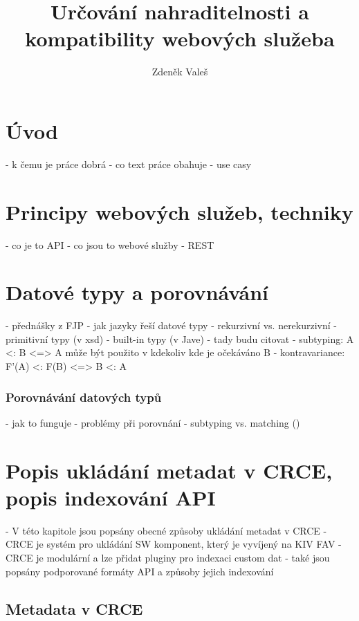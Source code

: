 \documentclass[czech,DP]{thesiskiv}
\author{Zdeněk Valeš}
\title{Určování nahraditelnosti a\\kompatibility webových služeba}
\begin{document}
%
\maketitle
\tableofcontents

\chapter{Úvod}

- k čemu je práce dobrá
- co text práce obahuje
- use casy

\chapter{Principy webových služeb, techniky}

 - co je to API
 - co jsou to webové služby
 - REST

\chapter{Datové typy a porovnávání}

- přednášky z FJP
- jak jazyky řeší datové typy
	- rekurzivní vs. nerekurzivní
- primitivní typy (v xsd)
- built-in typy (v Jave)
- tady budu citovat \cite{abadi1995subytping}
	- subtyping: A <: B <=> A může být použito v kdekoliv kde je očekáváno B
	- kontravariance: F'(A) <: F(B) <=> B <: A

\subsection{Porovnávání datových typů}

 - jak to funguje
 - problémy při porovnání
 - subtyping vs. matching (\cite{abadi1995subytping})


\chapter{Popis ukládání metadat v CRCE, popis indexování API}

 - V této kapitole jsou popsány obecné způsoby ukládání metadat v CRCE \cite{brada2015repository}
 - CRCE je systém pro ukládání SW komponent, který je vyvíjený na KIV FAV
 - CRCE je modulární a lze přidat pluginy pro indexaci custom dat
 - také jsou popsány podporované formáty API a způsoby jejich indexování

\section{Metadata v CRCE}
\end{document}
